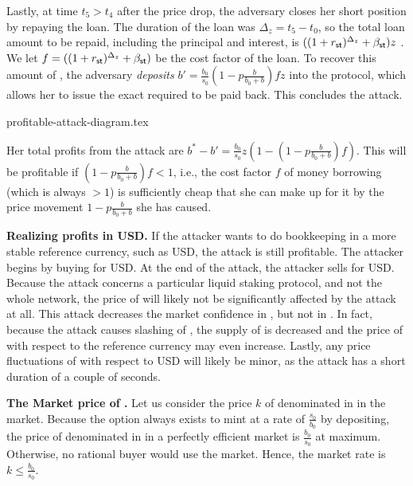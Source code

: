 Lastly, at time $t_5 > t_4$ after the price drop, the adversary closes her short position by repaying the
\stasset loan. The duration of the loan was $\Delta_z = t_5 - t_0$, so the
total loan amount to be repaid, including the principal and interest, is
$((1 + r_{\textsf{st}})^{\Delta_z} + \beta_{\textsf{st}}) z$ \stasset.
We let $f = ((1 + r_{\textsf{st}})^{\Delta_z} + \beta_{\textsf{st}})$ be the cost factor
of the loan.
To recover this amount of \stasset, the adversary \emph{deposits}
$b' = \frac{b_0}{s_0}(1 - p\frac{b}{b_0 + b}) f z$ \asset
into the protocol, which allows her to issue the exact required \stasset
to be paid back. This concludes the attack.

{profitable-attack-diagram.tex}

Her total profits from the attack are
$b^* - b' = \frac{b_0}{s_0}z(1 - (1 - p\frac{b}{b_0 + b}) f)$.
This will be profitable if $(1 - p\frac{b}{b_0 + b}) f < 1$,
i.e., the cost factor $f$ of money borrowing (which is always $> 1$) is
sufficiently cheap that she can make up for it by the price movement
$1 - p\frac{b}{b_0 + b}$ she has caused.

\noindent
\textbf{Realizing profits in USD.}
If the attacker wants to do bookkeeping in a more stable reference currency,
such as USD, the attack is still profitable. The attacker begins by buying
\asset for USD. At the end of the attack, the attacker sells \asset for USD.
Because the attack concerns a particular liquid staking protocol, and
not the whole \asset network, the price of \asset will likely not
be significantly affected by the attack at all.
This attack decreases the market confidence in \stasset,
but not in \asset.
In fact, because
the attack causes slashing of \asset, the supply of \asset is decreased
and the price of \asset with respect to the reference currency may
even increase.
Lastly, any price fluctuations of \asset with respect to USD will likely be
minor, as the attack has a short duration of a couple of seconds.

\noindent
\textbf{The Market price of \stasset.}\label{sec:stasset-price}
Let us consider the price $k$ of \stasset denominated in \asset in the market.
Because the option always exists to mint at a rate of $\frac{s_0}{b_0}$ by
depositing, the price of \stasset denominated in \asset in a perfectly
efficient market is $\frac{b_0}{s_0}$ at maximum. Otherwise, no
rational buyer would use the market. Hence, the market rate is
$k \leq \frac{b_0}{s_0}$.

